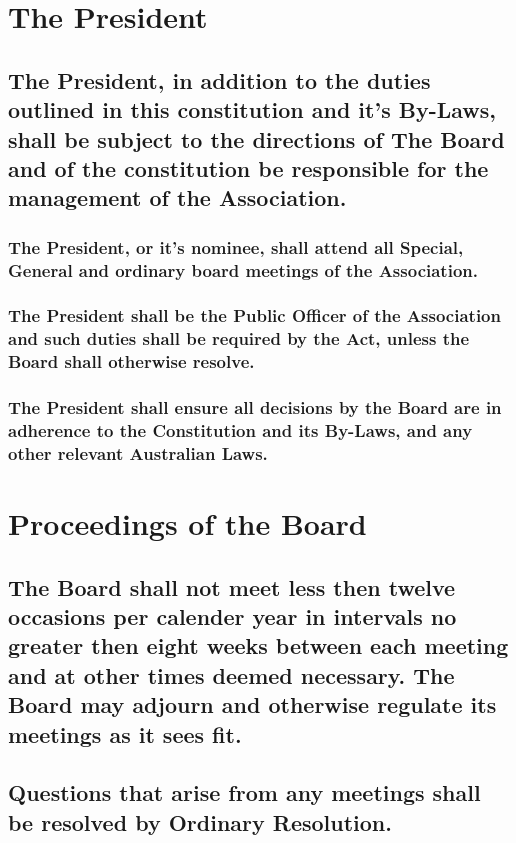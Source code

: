 \documentclass{article}
\newenvironment{subs}
  {\adjustwidth{2em}{0pt}}
  {\endadjustwidth}
\begin{document}
\begin{subs}
\begin{subs}
\section{The President}
\begin{subs}
\subsection{The President, in addition to the duties outlined in this constitution and it’s By-Laws, shall be subject to the directions of The Board and of the constitution be responsible for the management of the Association.}
\begin{subs}
\subsubsection{The President, or it’s nominee, shall attend all Special, General and ordinary board meetings of the Association.}
\subsubsection{The President shall be the Public Officer of the Association and such duties shall be required by the Act, unless the Board shall otherwise resolve.}
\subsubsection{The President shall ensure all decisions by the Board are in adherence to the Constitution and its By-Laws, and any other relevant Australian Laws.}
\end{subs}
\end{subs}

\section{Proceedings of the Board}
\begin{subs}
\subsection{The Board shall not meet less then twelve occasions per calender year in intervals no greater then eight weeks between each meeting and at other times deemed necessary. The Board may adjourn and otherwise regulate its meetings as it sees fit.}
\subsection{Questions that arise from any meetings shall be resolved by Ordinary Resolution.}
\end{subs}
\newpage


\end{subs}
\end{subs}
\end{document}
